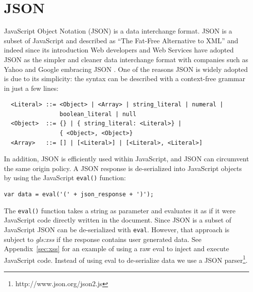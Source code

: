 \section{JSON}\label{sec:json}
JavaScript Object Notation (JSON) is a data interchange format. JSON is a subset
of JavaScript and described as ``The Fat-Free Alternative to XML''
\citep{json:fat-free} and indeed since its introduction Web developers and Web
Services have adopted JSON as the simpler and cleaner data interchange format
with companies such as Yahoo and Google embracing JSON
\citep{json:yahoo,json:google}. One of the reasons JSON is
widely adopted is due to its simplicity: the syntax can be described with a
context-free grammar in just a few lines:
\begin{verbatim}
  <Literal> ::= <Object> | <Array> | string_literal | numeral | 
                boolean_literal | null 
  <Object>  ::= {} | { string_literal: <Literal>} | 
                { <Object>, <Object>} 
  <Array>   ::= [] | [<Literal>] | [<Literal>, <Literal>]
\end{verbatim}
In addition, JSON is efficiently used within JavaScript, and JSON can circumvent
the same origin policy. A JSON response is de-serialized into JavaScript objects
by using the JavaScript \verb|eval()| function:
\begin{verbatim}
var data = eval('(' + json_response + ')');
\end{verbatim}
The \verb|eval()| function takes a string as parameter and evaluates it as if it
were JavaScript code directly written in the document. Since JSON is a subset of
JavaScript \citep{json:fat-free} JSON can be de-serialized with
\verb|eval|. However, that approach is subject to \textit{\gls{gls:xss}} if the
response contains user generated data. See Appendix~\ref{sec:xss} for an example
of using a raw eval to inject and execute JavaScript code. Instead of using eval
to de-serialize data we use a JSON parser\footnote{http://www.json.org/json2.js}.

